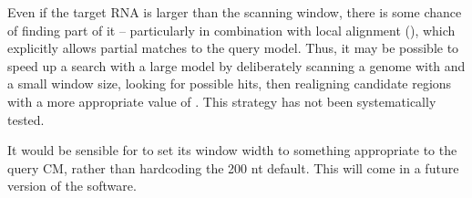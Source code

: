 Even if the target RNA is larger than the scanning window, there is
some chance of finding part of it -- particularly in combination with
local alignment (), which explicitly allows partial
matches to the query model. Thus, it may be possible to speed up a
search with a large model by deliberately scanning a genome with
 and a small window size, looking for possible hits,
then realigning candidate regions with a more appropriate value of
. This strategy has not been systematically tested.

It would be sensible for  to set its window width to
something appropriate to the query CM, rather than hardcoding the 200
nt default. This will come in a future version of the software.











